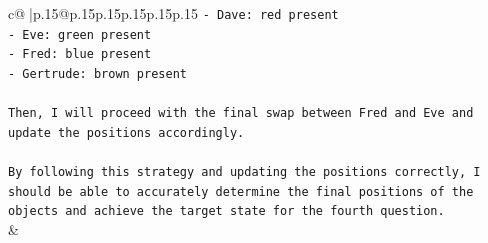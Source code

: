 \documentclass{article}
\begin{document}
{\begin{supertabular}{c@{$\;$}|p{.15\linewidth}@{}p{.15\linewidth}p{.15\linewidth}p{.15\linewidth}p{.15\linewidth}p{.15\linewidth}}
{{{\texttt{{-} Dave: red present} \\
\texttt{{-} Eve: green present} \\
\texttt{{-} Fred: blue present} \\
\texttt{{-} Gertrude: brown present} \\
\\ 
\texttt{Then, I will proceed with the final swap between Fred and Eve and update the positions accordingly.} \\
\\ 
\texttt{By following this strategy and updating the positions correctly, I should be able to accurately determine the final positions of the objects and achieve the target state for the fourth question.} \\
            }
        }
    }
    & \\ \\

\end{supertabular}
}
\end{document}
